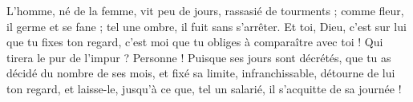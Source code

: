 \lettrine{L}{}’homme, né de la femme, vit peu de jours, rassasié de tourments ;
comme fleur, il germe et se fane ; tel une ombre, il fuit sans s’arrêter.
Et toi, Dieu, c’est sur lui que tu fixes ton regard, c’est moi que tu obliges à comparaître avec toi !
Qui tirera le pur de l’impur ? Personne !
Puisque ses jours sont décrétés, que tu as décidé du nombre de ses mois, et fixé sa limite, infranchissable,
détourne de lui ton regard, et laisse-le, jusqu’à ce que, tel un salarié, il s’acquitte de sa journée !